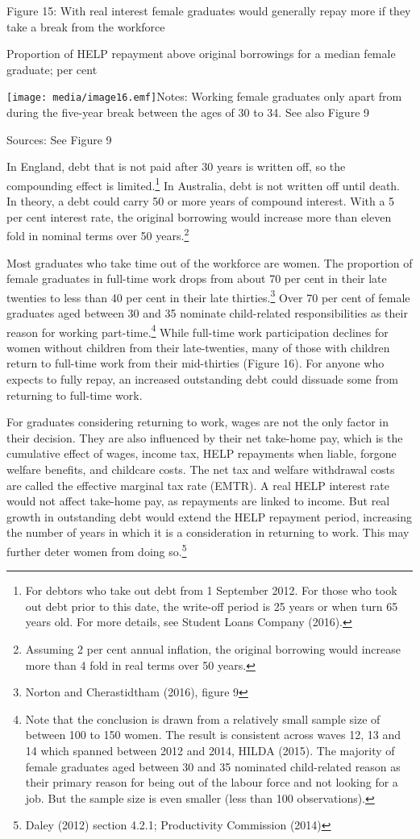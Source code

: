 \documentclass[]{book}
\begin{document}
\protect\hypertarget{_Ref310601401}{}{}Figure 15: With real interest female graduates would generally repay more if they take a break from the workforce

Proportion of HELP repayment above original borrowings for a median female graduate; per cent

\texttt{[image: media/image16.emf]}Notes: Working female graduates only apart from during the five-year break between the ages of 30 to 34. See also Figure 9

Sources: See Figure 9

In England, debt that is not paid after 30 years is written off, so the compounding effect is limited.\footnote{For debtors who take out debt from 1 September 2012. For those who took out debt prior to this date, the write-off period is 25 years or when turn 65 years old. For more details, see Student Loans Company (2016).} In Australia, debt is not written off until death. In theory, a debt could carry 50 or more years of compound interest. With a 5 per cent interest rate, the original borrowing would increase more than eleven fold in nominal terms over 50 years.\footnote{Assuming 2 per cent annual inflation, the original borrowing would increase more than 4 fold in real terms over 50 years.}

Most graduates who take time out of the workforce are women. The proportion of female graduates in full-time work drops from about 70 per cent in their late twenties to less than 40 per cent in their late thirties.\footnote{Norton and Cherastidtham (2016), figure 9} Over 70 per cent of female graduates aged between 30 and 35 nominate child-related responsibilities as their reason for working part-time.\footnote{Note that the conclusion is drawn from a relatively small sample size of between 100 to 150 women. The result is consistent across waves 12, 13 and 14 which spanned between 2012 and 2014, HILDA (2015). The majority of female graduates aged between 30 and 35 nominated child-related reason as their primary reason for being out of the labour force and not looking for a job. But the sample size is even smaller (less than 100 observations).} While full-time work participation declines for women without children from their late-twenties, many of those with children return to full-time work from their mid-thirties (Figure 16). For anyone who expects to fully repay, an increased outstanding debt could dissuade some from returning to full-time work.

For graduates considering returning to work, wages are not the only factor in their decision. They are also influenced by their net take-home pay, which is the cumulative effect of wages, income tax, HELP repayments when liable, forgone welfare benefits, and childcare costs. The net tax and welfare withdrawal costs are called the effective marginal tax rate (EMTR). A real HELP interest rate would not affect take-home pay, as repayments are linked to income. But real growth in outstanding debt would extend the HELP repayment period, increasing the number of years in which it is a consideration in returning to work. This may further deter women from doing so.\footnote{Daley (2012) section 4.2.1; Productivity Commission (2014)}
\end{document}
